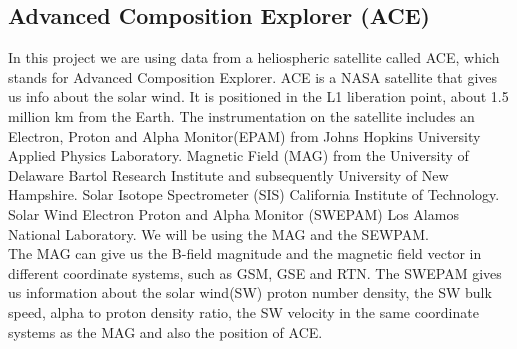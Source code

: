 \documentclass[norsk,a4paper,11pt]{article}
\begin{document}
\begin{multicols}{2}
\subsection{Advanced Composition Explorer (ACE)} %
\label{sub:ACE}
	In this project we are using data from a heliospheric satellite called ACE, which stands for Advanced Composition Explorer. ACE is a NASA satellite that gives us info about the solar wind. It is positioned in the L1 liberation point, about 1.5 million km from the Earth. The instrumentation on the satellite includes an Electron, Proton and Alpha Monitor(EPAM) from Johns Hopkins University Applied Physics Laboratory. Magnetic Field (MAG) from the University of Delaware Bartol Research Institute and subsequently University of New Hampshire. Solar Isotope Spectrometer (SIS) California Institute of Technology. Solar Wind Electron Proton and Alpha Monitor (SWEPAM) Los Alamos National Laboratory. We will be using the MAG and the SEWPAM. \\

	The MAG can give us the B-field magnitude and the magnetic field vector in different coordinate systems, such as GSM, GSE and RTN. The SWEPAM gives us information about the solar wind(SW) proton number density, the SW bulk speed, alpha to proton density ratio, the SW velocity in the same coordinate systems as the MAG and also the position of ACE.


\end{multicols}
\end{document}
